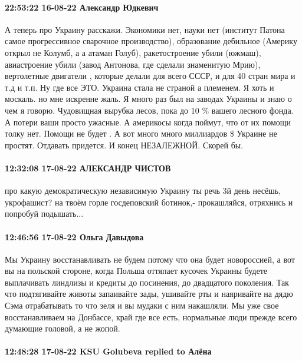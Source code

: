 \paragraph{22:53:22 16-08-22 Александр Юдкевич}

А теперь про Украину расскажи. Экономики нет, науки нет (институт Патона самое
прогрессивное сварочное производство), образование дебильное (Америку открыл не
Колумб, а а атаман Голуб), ракетостроение убили (южмаш), авиастроение убили
(завод Антонова, где сделали знаменитую Мрию), вертолетные двигатели , которые
делали для всего СССР, и для 40 стран мира и т.д и т.п. Ну где все ЭТО. Украина
стала не страной а племенем. Я хоть и москаль. но мне искренне жаль. Я много
раз был на заводах Украины и знаю о чем я говорю. Чудовищная вырубка лесов,
пока до 10 \% вашего лесного фонда. А потери ваши просто ужасные. А америкосы
когда поймут, что от их помощи толку нет. Помощи не будет . А вот много много
миллиардов \$ Украине не простят. Отдавать придется. И конец НЕЗАЛЕЖНОЙ. Скорей
бы.

\paragraph{12:32:08 17-08-22 АЛЕКСАНДР ЧИСТОВ}

про какую демократическую независимую Украину ты речь 3й день несёшь,
укрофашист? на твоём горле госдеповский ботинок,- прокашляйся, отряхнись и
попробуй подышать...

\paragraph{12:46:56 17-08-22 Ольга Давыдова}

Мы Украину восстанавливать не будем потому что она будет новороссией, а вот вы
на польской стороне, когда Польша оттяпает кусочек Украины будете выплачивать
линдлизы и кредиты до посинения, до двадцатого поколения. Так что подтягивайте
животы запаивайте зады, ушивайте рты и наяривайте на дядю Сэма отрабатывать то
что зеля и вы мудаки с ним накашляли. Мы уже свое восстанавливаем на Донбассе,
край где все есть, нормальные люди прежде всего думающие головой, а не жопой.

\paragraph{12:48:28 17-08-22 KSU Golubeva replied to Алёна}

